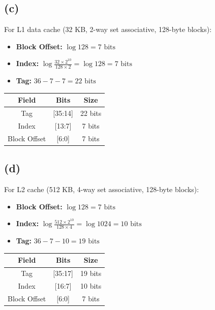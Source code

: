 \documentclass[12pt]{article}
\begin{document}
\subsection*{(c)}

For L1 data cache (32 KB, 2-way set associative, 128-byte blocks):
\begin{itemize}
    \item \textbf{Block Offset:} $\log 128 = 7 \text{ bits}$
    \item \textbf{Index:} $\log \frac{32 \times 2^{10}}{128 \times 2} = \log 128 = 7 \text{ bits}$
    \item \textbf{Tag:} $36 - 7 - 7 = 22 \text{ bits}$
\end{itemize}

\begin{table}[h]
    \centering
    \begin{tabular}{|c|c|c|}
    \hline
    \textbf{Field} & \textbf{Bits} & \textbf{Size} \\
    \hline
    Tag & [35:14] & 22 bits \\
    \hline
    Index & [13:7] & 7 bits \\
    \hline
    Block Offset & [6:0] & 7 bits \\
    \hline
    \end{tabular}
\end{table}

\subsection*{(d)}

For L2 cache (512 KB, 4-way set associative, 128-byte blocks):
\begin{itemize}
    \item \textbf{Block Offset:} $\log 128 = 7 \text{ bits}$
    \item \textbf{Index:} $\log \frac{512 \times 2^{10}}{128 \times 4} = \log 1024 = 10 \text{ bits}$
    \item \textbf{Tag:} $36 - 7 - 10 = 19 \text{ bits}$
\end{itemize}

\begin{table}[h]
    \centering
    \begin{tabular}{|c|c|c|}
    \hline
    \textbf{Field} & \textbf{Bits} & \textbf{Size} \\
    \hline
    Tag & [35:17] & 19 bits \\
    \hline
    Index & [16:7] & 10 bits \\
    \hline
    Block Offset & [6:0] & 7 bits \\
    \hline
    \end{tabular}
\end{table}
\end{document}
